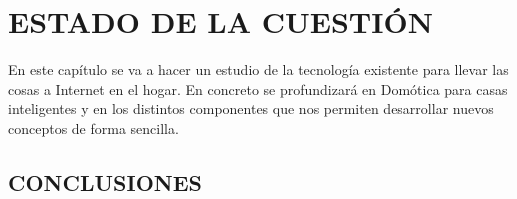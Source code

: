 \chapter{ESTADO DE LA CUESTIÓN}

En este capítulo se va a hacer un estudio de la tecnología existente para llevar las cosas a Internet en el hogar. En concreto se profundizará en Domótica para casas inteligentes y en los distintos componentes que nos permiten desarrollar nuevos conceptos de forma sencilla.





\section{CONCLUSIONES}